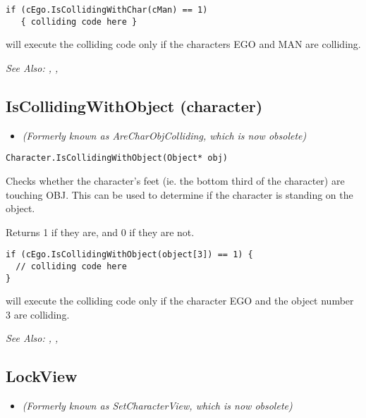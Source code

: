 \begin{verbatim}
if (cEgo.IsCollidingWithChar(cMan) == 1)
   { colliding code here }
\end{verbatim}
will execute the colliding code only if the characters EGO and MAN are colliding.

\it{See Also:} ,
,


\subsection{IsCollidingWithObject (character)}\label{Character.IsCollidingWithObject}%

\begin{itemize}
\item \it{(Formerly known as AreCharObjColliding, which is now obsolete)}
\end{itemize}

\begin{verbatim}
Character.IsCollidingWithObject(Object* obj)
\end{verbatim}
Checks whether the character's feet (ie. the bottom third of the character) are
touching OBJ. This can be used to determine if the character is standing on the object.

Returns 1 if they are, and 0 if they are not.

\begin{verbatim}
if (cEgo.IsCollidingWithObject(object[3]) == 1) {
  // colliding code here
}
\end{verbatim}
will execute the colliding code only if the character EGO and the object number 3 are colliding.

\it{See Also:} ,
,


\subsection{LockView}\label{Character.LockView}%

\begin{itemize}
\item \it{(Formerly known as SetCharacterView, which is now obsolete)}
\end{itemize}

